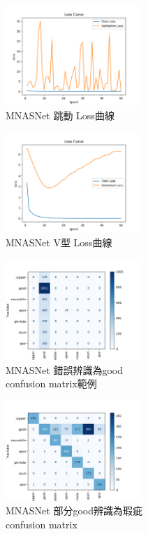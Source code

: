 %
\begin{figure}[!ht]
    \centering
    \includegraphics[width=0.45\textwidth]{./img/MNASNet/P1.png}
    \caption{MNASNet 跳動 Loss曲線}
    \label{fig:MNASNet_P1}
\end{figure}
\begin{figure}[!ht]
    \centering
    \includegraphics[width=0.45\textwidth]{./img/MNASNet/P2.png}
    \caption{MNASNet V型 Loss曲線}
    \label{fig:MNASNet_P2}
\end{figure}
\begin{figure}[!ht]
    \centering
    \includegraphics[width=0.45\textwidth]{./img/MNASNet/P3.png}
    \caption{MNASNet 錯誤辨識為good\protect\\
             confusion matrix範例}
    \label{fig:MNASNet_P3}
\end{figure}
\begin{figure}[!ht]
    \centering
    \includegraphics[width=0.45\textwidth]{./img/MNASNet/P4.png}
    \caption{MNASNet 部分good辨識為瑕疵\protect\\
             confusion matrix}
    \label{fig:MNASNet_P4}
\end{figure}
